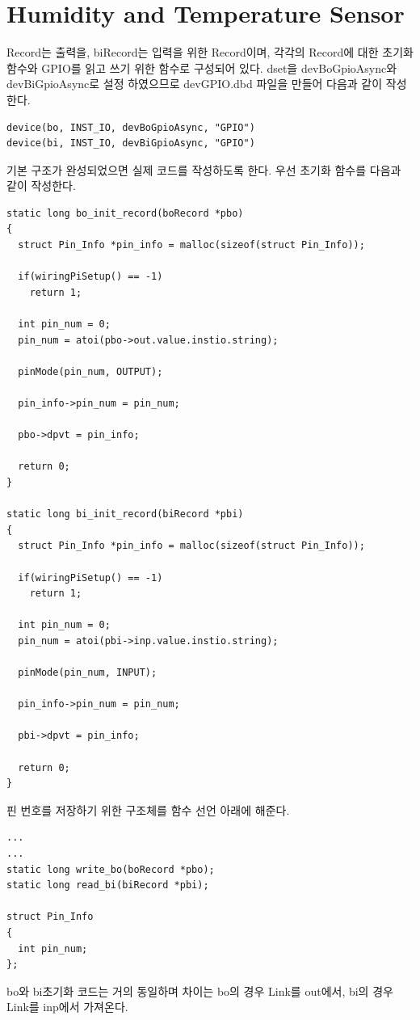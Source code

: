 \documentclass[11pt
  , a4paper
  , article
  , oneside
]{memoir}
\begin{document}
\section{Humidity and Temperature Sensor}
Record는 출력을, biRecord는 입력을 위한 Record이며, 각각의 Record에 대한 초기화 함수와 GPIO를 
읽고 쓰기 위한 함수로 구성되어 있다. dset을 devBoGpioAsync와 devBiGpioAsync로 설정 하였으므로 
devGPIO.dbd 파일을 만들어 다음과 같이 작성한다. 
\begin{lstlisting}[style=termstyle]
device(bo, INST_IO, devBoGpioAsync, "GPIO")
device(bi, INST_IO, devBiGpioAsync, "GPIO")
\end{lstlisting}
기본 구조가 완성되었으면 실제 코드를 작성하도록 한다. 우선 초기화 함수를 다음과 같이 작성한다.
\begin{lstlisting}[style=termstylenumber, caption={Editing \texttt{/etc/fai/NFSROOT}}, label={list:nfsroot-file}]
static long bo_init_record(boRecord *pbo)
{
  struct Pin_Info *pin_info = malloc(sizeof(struct Pin_Info));

  if(wiringPiSetup() == -1)
    return 1;

  int pin_num = 0;
  pin_num = atoi(pbo->out.value.instio.string);

  pinMode(pin_num, OUTPUT);

  pin_info->pin_num = pin_num;

  pbo->dpvt = pin_info;

  return 0;
}

static long bi_init_record(biRecord *pbi)
{
  struct Pin_Info *pin_info = malloc(sizeof(struct Pin_Info));

  if(wiringPiSetup() == -1)
    return 1;

  int pin_num = 0;
  pin_num = atoi(pbi->inp.value.instio.string);

  pinMode(pin_num, INPUT);

  pin_info->pin_num = pin_num;

  pbi->dpvt = pin_info;

  return 0;
}
\end{lstlisting}
핀 번호를 저장하기 위한 구조체를 함수 선언 아래에 해준다.
\begin{lstlisting}[style=termstylenumber, caption={Editing \texttt{/etc/fai/NFSROOT}}, label={list:nfsroot-file}]
...
...
static long write_bo(boRecord *pbo);
static long read_bi(biRecord *pbi);

struct Pin_Info
{
  int pin_num;
}; 
\end{lstlisting}
bo와 bi초기화 코드는 거의 동일하며 차이는 bo의 경우 Link를 out에서, bi의 경우 Link를 inp에서 가져온다. 
\end{document}
